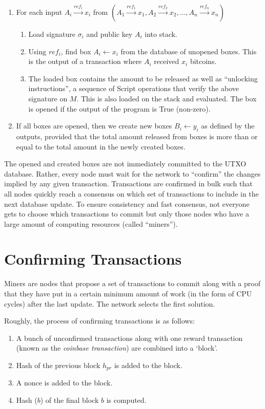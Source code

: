 \documentclass[]{report}   %
\newcommand{\sr}{\stackrel}
\newcommand{\ra}{\rightarrow}
\newcommand{\la}{\leftarrow}
\begin{document}
\begin{enumerate}
  \item	For each input $A_i\sr{ref_i}{\ra}x_i$ from $(A_1\sr{ref_1}{\ra}x_1, A_2\sr{ref_2}{\ra}x_2, \ldots, A_n\sr{ref_n}{\ra}x_n)$
	
	\begin{enumerate}
		\item Load signature $\sigma_i$ and public key $A_i$ into stack. 
		\item Using $ref_i$, find box $A_{i}\la x_i$ from the database of unopened boxes. This is the output of a transaction where $A_i$ received $x_i$ bitcoins. 
		\item The loaded box contains the amount to be released as well as ``unlocking instructions'', a sequence of Script operations that verify the above signature on $M$. This is also loaded on the stack and evaluated. The box is opened if the output of the program is True (non-zero).
	\end{enumerate}
	\item If all boxes are opened, then we create new boxes $B_i\la y_i$ as defined by the outputs, provided that the total amount released from boxes is more than or equal to the total amount in the newly created boxes. 
\end{enumerate}

The opened and created boxes are not immediately committed to the UTXO database. Rather, every node must wait for the network to ``confirm'' the changes implied by any given transaction.  
Transactions are confirmed in bulk such that all nodes quickly reach a consensus on which set of transactions to include in the next database update. 
To ensure consistency and fast consensus, not everyone gets to choose which transactions to commit but only those nodes who have a large amount of computing resources (called ``miners'').

 
\section{Confirming Transactions}
\label{sec:verify}
Miners are nodes that propose a set of transactions to commit along with a proof that they have put in a certain minimum amount of work (in the form of CPU cycles) after the last update. The network selects the first solution. 

Roughly, the process of confirming transactions is as follows: 
\begin{enumerate}
	\item A bunch of unconfirmed transactions along with one reward transaction %
	(known as the \emph{coinbase transaction}) are combined into a `block'.
	\item Hash of the previous block $h_{pr}$ is added to the block. %
	\item A nonce is added to the block.
	\item Hash%
	($b$) %
	 of the final block $b$ is computed. 	
\end{enumerate}
\end{document}

